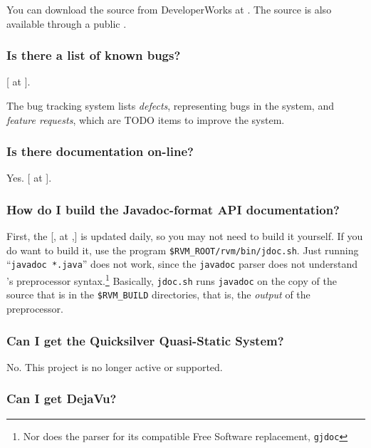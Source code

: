 You can download the \jrvm{} source from DeveloperWorks at \xlink{{\tt
\RVMDownloadURL}}{\RVMDownloadURL}.  The \jrvm{} source is also available
through a public .

\subsubsection{Is there a list of known bugs?}

[ at 
{\tt \RVMBugURL}]{\RVMBugURL}.

The bug tracking system lists {\em defects}, representing bugs in the system, and
{\em feature requests}, which are TODO items to improve the system.

\subsubsection{Is there documentation on-line?}

Yes.  [ at
{\tt \RVMHomeURL}]{\RVMHomeURL}.

\subsubsection{How do I build the Javadoc-format API documentation?}%
%

First, the [, at {\tt \RVMJavadocURL},]{%
    \RVMJavadocURL} is updated daily, so you may not need to build it
yourself.  If you do want to build it, use the program
\texttt{\$RVM\_ROOT/rvm/bin/jdoc.sh}.   Just running
``\texttt{javadoc *.java}'' does not work, since the \texttt{javadoc}
parser does not understand \jrvm{}'s preprocessor syntax.\footnote{Nor does
the parser for its compatible Free Software replacement,
\texttt{gjdoc}}
Basically, \texttt{jdoc.sh} runs \texttt{javadoc} on the copy of the
source that is in the \texttt{\$RVM\_BUILD} directories, that is, the
{\em output} of the preprocessor. 

\subsubsection{Can I get the Quicksilver Quasi-Static System?}

No. This project is no longer active or supported.

\subsubsection{Can I get DejaVu?}

